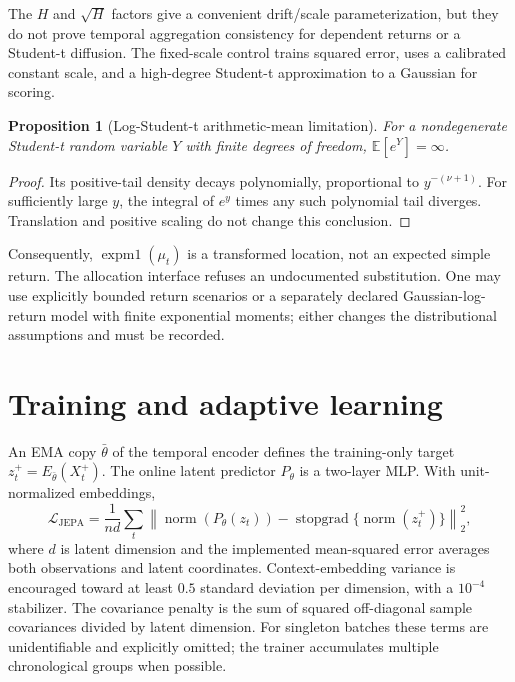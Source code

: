 \documentclass[11pt,a4paper]{article}
\newcommand{\E}{\mathbb E}
\newcommand{\sg}{\operatorname{stopgrad}}
\newtheorem{proposition}{Proposition}
\begin{document}
The $H$ and $\sqrt H$ factors give a convenient drift/scale parameterization, but they do not prove temporal aggregation consistency for dependent returns or a Student-t diffusion. The fixed-scale control trains squared error, uses a calibrated constant scale, and a high-degree Student-t approximation to a Gaussian for scoring.

\begin{proposition}[Log-Student-t arithmetic-mean limitation]
For a nondegenerate Student-t random variable $Y$ with finite degrees of freedom, $\E[e^Y]=\infty$.
\end{proposition}
\begin{proof}
Its positive-tail density decays polynomially, proportional to $y^{-(\nu+1)}$. For sufficiently large $y$, the integral of $e^y$ times any such polynomial tail diverges. Translation and positive scaling do not change this conclusion.
\end{proof}
Consequently, $\operatorname{expm1}(\mu_t)$ is a transformed location, not an expected simple return. The allocation interface refuses an undocumented substitution. One may use explicitly bounded return scenarios or a separately declared Gaussian-log-return model with finite exponential moments; either changes the distributional assumptions and must be recorded.

\section{Training and adaptive learning}

An EMA copy $\bar\theta$ of the temporal encoder defines the training-only target $z_t^+=E_{\bar\theta}(X_t^+)$. The online latent predictor $P_\theta$ is a two-layer MLP. With unit-normalized embeddings,
\begin{equation}
\mathcal L_{\mathrm{JEPA}}=\frac1{nd}\sum_t\left\|\operatorname{norm}(P_\theta(z_t))-\sg\{\operatorname{norm}(z_t^+)\}\right\|_2^2,
\end{equation}
where $d$ is latent dimension and the implemented mean-squared error averages both observations and latent coordinates. Context-embedding variance is encouraged toward at least $0.5$ standard deviation per dimension, with a $10^{-4}$ stabilizer. The covariance penalty is the sum of squared off-diagonal sample covariances divided by latent dimension. For singleton batches these terms are unidentifiable and explicitly omitted; the trainer accumulates multiple chronological groups when possible.
\end{document}

